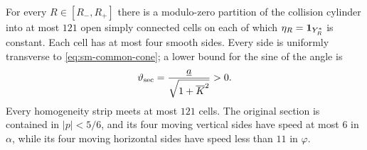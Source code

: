 \begin{lemma}
\label{lem:sm-grid}
For every $R\in[R_-,R_+]$ there is a modulo-zero partition of the
collision cylinder into at most $121$ open simply connected cells
on each of which $\eta_R=\mathbf1_{Y_R^*}$ is constant. Each cell has
at most four smooth sides. Every side is uniformly transverse to
\eqref{eq:sm-common-cone}; a lower bound for the sine of the angle is
\begin{equation}\label{eq:sm-transversality}
 \vartheta_{\rm sec}=
 \frac{\underline a}{\sqrt{1+\overline K^2}}>0.
\end{equation}
Every homogeneity strip meets at most $121$ cells. The original
section is contained in $|p|<5/6$, and its four moving vertical
sides have speed at most $6$ in $\alpha$, while its four moving
horizontal sides have speed less than $11$ in $\varphi$.
\end{lemma}
